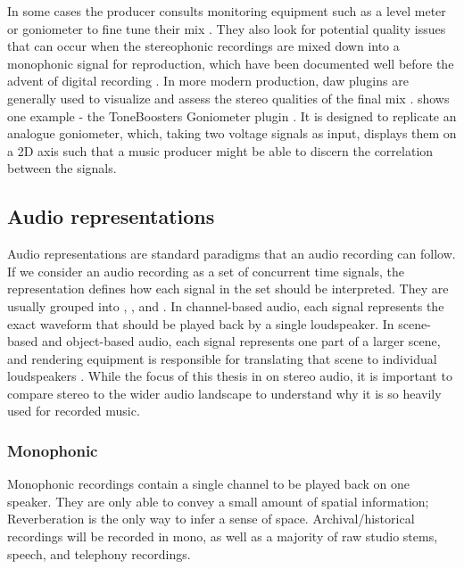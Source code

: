 In some cases the producer consults monitoring equipment such as a level meter or goniometer to fine tune their mix \cite{ziemerAcousticFeaturesRecording2021,ziemerGoniometersArePowerful2023}. They also look for potential quality issues that can occur when the stereophonic recordings are mixed down into a monophonic signal for reproduction, which have been documented well before the advent of digital recording \cite{harveyCompatibilityProblemsTwochannel1962}. In more modern production, \gls{daw} plugins are generally used to visualize and assess the stereo qualities of the final mix \cite{bitzerSpatialDistributionMeter2007,ziemerGoniometersArePowerful2023}.  shows one example - the ToneBoosters Goniometer plugin \cite{ToneBoostersAudioPlugins}. It is designed to replicate an analogue goniometer, which, taking two voltage signals as input, displays them on a 2D axis such that a music producer might be able to discern the correlation between the signals.

\FloatBarrier

\subsection{Audio representations}
Audio representations are standard paradigms that an audio recording can follow. If we consider an audio recording as a set of concurrent time signals, the representation defines how each signal in the set should be interpreted. They are usually grouped into , , and . In channel-based audio, each signal represents the exact waveform that should be played back by a single loudspeaker. In scene-based and object-based audio, each signal represents one part of a larger scene, and rendering equipment is responsible for translating that scene to individual loudspeakers \cite{sugimotoSpecificationAudioRepresentations2024}. While the focus of this thesis in on stereo audio, it is important to compare stereo to the wider audio landscape to understand why it is so heavily used for recorded music.

\subsubsection*{Monophonic}
Monophonic recordings contain a single channel to be played back on one speaker. They are only able to convey a small amount of spatial information; Reverberation is the only way to infer a sense of space. Archival/historical recordings will be recorded in mono, as well as a majority of raw studio stems, speech, and telephony recordings.


